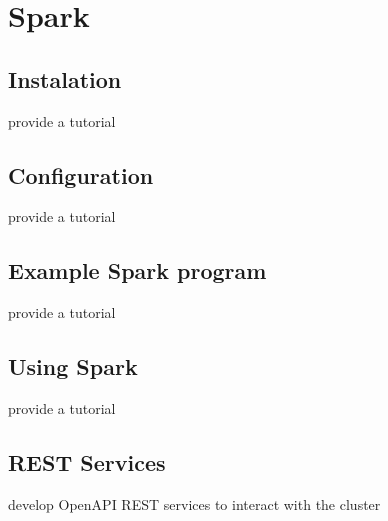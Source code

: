 \chapter{Spark}


\section{Instalation}

\begin{exercise}
provide a tutorial 
\end{exercise}

\section{Configuration}

\begin{exercise}
provide a tutorial 
\end{exercise}

\section{Example Spark program}

\begin{exercise}
provide a tutorial 
\end{exercise}

\section{Using Spark}

\begin{exercise}
provide a tutorial 
\end{exercise}

\section{REST Services}

\begin{exercise}
develop OpenAPI REST services to interact with the cluster
\end{exercise}

